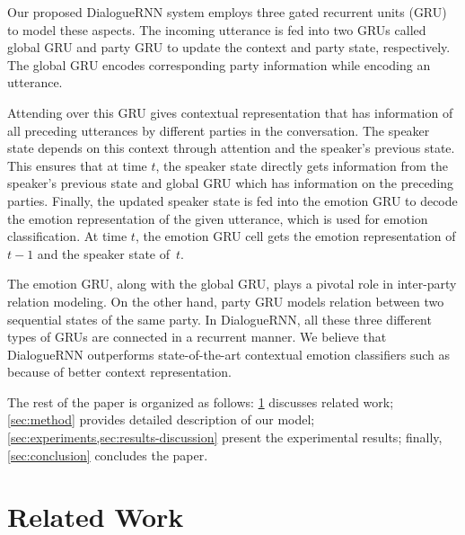 \documentclass[letterpaper]{article} %
\begin{document}
Our proposed DialogueRNN system employs three gated recurrent units (GRU)~\cite{DBLP:journals/corr/ChungGCB14} to model
these aspects.
The incoming utterance is fed into two GRUs called global GRU and party GRU to update the context and party state, respectively. The global GRU encodes corresponding party information while encoding an utterance. 

Attending over this GRU gives contextual representation that has information of all preceding utterances by different parties in the conversation. The speaker state depends on this context through attention and the speaker's previous state. This
ensures that at time $t$, the speaker state directly gets information from the speaker's previous state and 
global GRU which has information on the preceding parties. Finally, the updated speaker state
is fed into the emotion GRU to decode the emotion representation of the given utterance, which is used
for emotion classification. At time $t$, the emotion GRU cell gets the emotion representation 
of $t-1$ and the speaker state of~$t$.

The emotion GRU, along with the global GRU, plays a 
pivotal role in inter-party relation modeling. On the other hand, party GRU models relation between two 
sequential states of the same party. In DialogueRNN, all these three different types of GRUs are connected in a 
recurrent manner. We believe that DialogueRNN outperforms state-of-the-art  contextual emotion classifiers such as \cite{hazarika-EtAl:2018:N18-1,poria-EtAl:2017:Long} because of better context representation.

The rest of the paper is organized as follows: \cref{sec:related-works} discusses related work;
\cref{sec:method} provides detailed description of our model; \cref{sec:experiments,sec:results-discussion} present the experimental results; finally, \cref{sec:conclusion}
concludes the paper.



\section{Related Work}
\label{sec:related-works}
\end{document}
